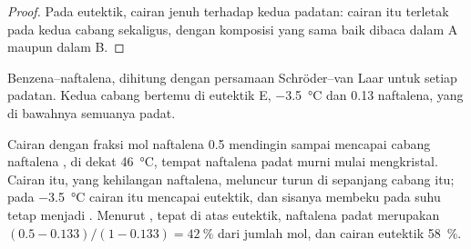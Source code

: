 \begin{proof}
Pada eutektik, cairan jenuh terhadap kedua padatan: cairan itu terletak
pada kedua cabang sekaligus, dengan komposisi yang sama baik dibaca dalam A
maupun dalam B.
\end{proof}

\begin{omfigure}

{\small Benzena--naftalena, dihitung dengan persamaan Schröder--van Laar
untuk setiap padatan. Kedua cabang bertemu di eutektik E,
\qty{-3.5}{\degreeCelsius} dan 0.13 naftalena, yang di bawahnya semuanya
padat.}
\end{omfigure}

\begin{example}\label{ex:b2:solid-liquid-diagrams:naphthalene}
Cairan dengan fraksi mol naftalena 0.5 mendingin sampai mencapai cabang
naftalena , di dekat \qty{46}{\degreeCelsius}, tempat naftalena
padat murni mulai mengkristal. Cairan itu, yang kehilangan naftalena,
meluncur turun di sepanjang cabang itu; pada \qty{-3.5}{\degreeCelsius}
cairan itu mencapai eutektik, dan sisanya membeku pada suhu tetap menjadi
. Menurut , tepat di atas eutektik, naftalena
padat merupakan $(0.5 - 0.133)/(1 - 0.133) =
42~\%$ dari jumlah mol, dan
cairan eutektik 58~\%.
\end{example}

